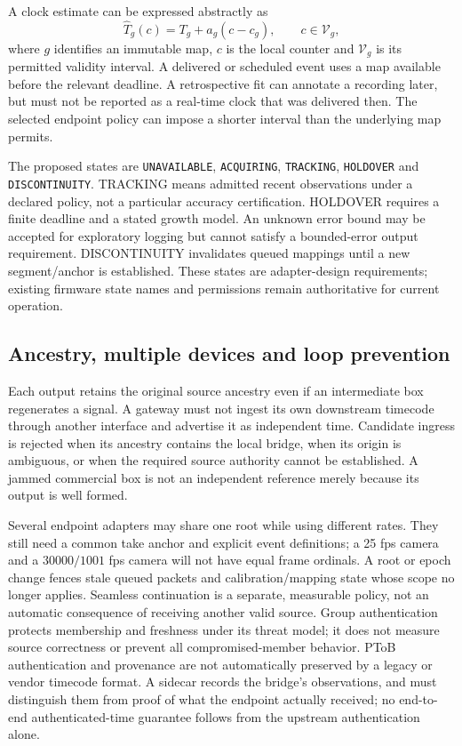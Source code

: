 \documentclass[11pt,letterpaper]{article}
\newcommand{\code}[1]{\texttt{#1}}
\begin{document}
A clock estimate can be expressed abstractly as
\begin{equation}
 \widehat{T}_g(c)=T_g+a_g(c-c_g),\qquad c\in\mathcal{V}_g,
 \label{eq:clock}
\end{equation}
where $g$ identifies an immutable map, $c$ is the local counter and $\mathcal{V}_g$ is its permitted validity interval. A delivered or scheduled event uses a map available before the relevant deadline. A retrospective fit can annotate a recording later, but must not be reported as a real-time clock that was delivered then. The selected endpoint policy can impose a shorter interval than the underlying map permits.

The proposed states are \code{UNAVAILABLE}, \code{ACQUIRING}, \code{TRACKING}, \code{HOLDOVER} and \code{DISCONTINUITY}. TRACKING means admitted recent observations under a declared policy, not a particular accuracy certification. HOLDOVER requires a finite deadline and a stated growth model. An unknown error bound may be accepted for exploratory logging but cannot satisfy a bounded-error output requirement. DISCONTINUITY invalidates queued mappings until a new segment/anchor is established. These states are adapter-design requirements; existing firmware state names and permissions remain authoritative for current operation.

\subsection{Ancestry, multiple devices and loop prevention}
Each output retains the original source ancestry even if an intermediate box regenerates a signal. A gateway must not ingest its own downstream timecode through another interface and advertise it as independent time. Candidate ingress is rejected when its ancestry contains the local bridge, when its origin is ambiguous, or when the required source authority cannot be established. A jammed commercial box is not an independent reference merely because its output is well formed.

Several endpoint adapters may share one root while using different rates. They still need a common take anchor and explicit event definitions; a 25 fps camera and a $30000/1001$ fps camera will not have equal frame ordinals. A root or epoch change fences stale queued packets and calibration/mapping state whose scope no longer applies. Seamless continuation is a separate, measurable policy, not an automatic consequence of receiving another valid source. Group authentication protects membership and freshness under its threat model; it does not measure source correctness or prevent all compromised-member behavior. PToB authentication and provenance are not automatically preserved by a legacy or vendor timecode format. A sidecar records the bridge's observations, and must distinguish them from proof of what the endpoint actually received; no end-to-end authenticated-time guarantee follows from the upstream authentication alone.
\end{document}

